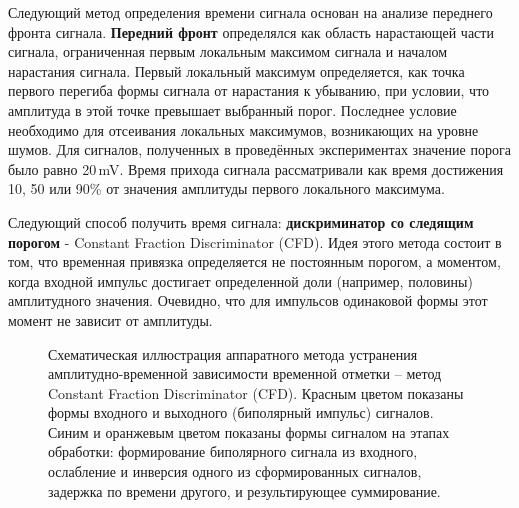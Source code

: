 Следующий метод определения времени сигнала основан на анализе переднего фронта сигнала. \textbf{Передний фронт} определялся как область нарастающей части сигнала, ограниченная первым локальным максимом сигнала и началом нарастания сигнала. Первый локальный максимум определяется, как точка первого перегиба формы сигнала от нарастания к убыванию, при условии, что амплитуда в этой точке превышает выбранный порог. Последнее условие необходимо для отсеивания локальных максимумов, возникающих на уровне шумов. Для сигналов, полученных в проведённых экспериментах значение порога было равно 20\,mV. 
Время прихода сигнала рассматривали как время достижения 10, 50 или 90\% от значения амплитуды первого локального максимума.

Следующий способ получить время сигнала: \textbf{дискриминатор со следящим порогом} - Constant Fraction Discriminator (CFD)\cite{methods}. Идея этого метода состоит в том, что временная привязка определяется не постоянным порогом, а моментом, когда входной импульс достигает определенной доли (например, половины) амплитудного значения. Очевидно, что для импульсов одинаковой формы этот момент не зависит от амплитуды. 

\begin{figure}[h]
	\caption{ Схематическая иллюстрация аппаратного метода устранения амплитудно-временной зависимости временной отметки – метод Constant Fraction Discriminator (CFD).  Красным цветом показаны формы входного и выходного (биполярный импульс) сигналов. Синим и оранжевым цветом показаны формы сигналом на этапах обработки: формирование биполярного сигнала из входного, ослабление и инверсия одного из сформированных сигналов,  задержка по времени другого, и результирующее суммирование.}
	\label{ris:cfd}
\end{figure}

